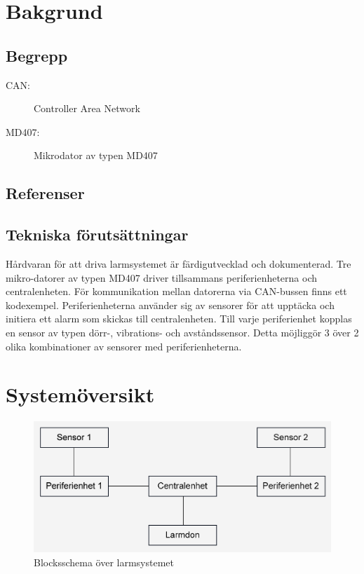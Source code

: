 \documentclass[a4paper]{article}
\begin{document}

\section{Bakgrund}

\subsection{Begrepp}

\begin{description}
    \item[CAN:] Controller Area Network
    \item[MD407:] Mikrodator av typen MD407 
\end{description}

\subsection{Referenser}

\subsection{Tekniska förutsättningar}

Hårdvaran för att driva larmsystemet är färdigutvecklad och dokumenterad. Tre mikro-datorer av typen MD407 driver tillsammans periferienheterna och centralenheten. För kommunikation mellan datorerna via CAN-bussen finns ett kodexempel. Periferienheterna använder sig av sensorer för att upptäcka och initiera ett alarm som skickas till centralenheten. Till varje periferienhet kopplas en sensor av typen dörr-, vibrations- och avståndssensor. Detta möjliggör 3 över 2 olika kombinationer av sensorer med periferienheterna.

\section{Systemöversikt}

\begin{figure}[H]
    \centering
    \includegraphics[width=\textwidth]{blockschema.png}
    \caption{Blocksschema över larmsystemet}
\end{figure}
\end{document}
